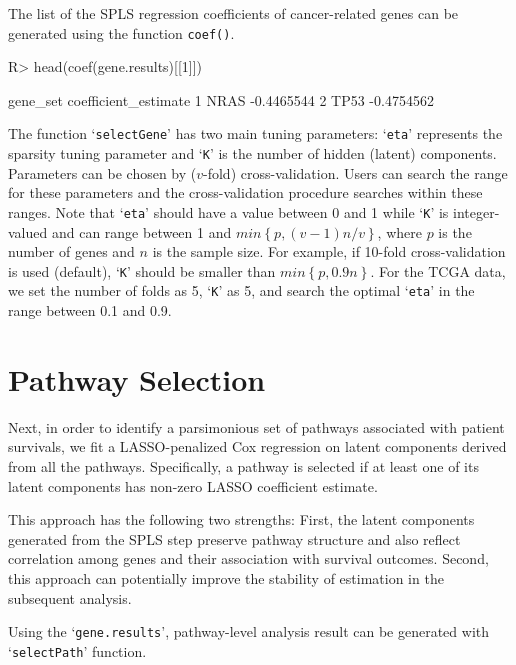 \documentclass[11pt]{article}
\begin{document}
The list of the SPLS regression coefficients of cancer-related genes can be generated using the function \texttt{coef()}.

\begin{Schunk}
\begin{Sinput}
R> head(coef(gene.results)[[1]])
\end{Sinput}
\begin{Soutput}
  gene_set coefficient_estimate
1     NRAS           -0.4465544
2     TP53           -0.4754562
\end{Soutput}
\end{Schunk}

The function `\texttt{selectGene}' has two main tuning parameters: `\texttt{eta}' represents the sparsity tuning parameter and `\texttt{K}' is the number of hidden (latent) components. Parameters can be chosen by ($v$-fold) cross-validation. Users can search the range for these parameters and the cross-validation procedure searches within these ranges. Note that `\texttt{eta}' should have a value between 0 and 1 while `\texttt{K}' is integer-valued and can range between
1 and $ min \left\{ p, (v-1) n / v \right\} $, where $p$ is the number of genes and $n$ is the sample size. For example, if 10-fold cross-validation is used (default), `\texttt{K}' should be smaller than $ min \left\{ p, 0.9 n \right\} $. For the TCGA data, we set the number of folds as 5, `\texttt{K}' as 5, and search  the optimal `\texttt{eta}' in the range between 0.1 and 0.9.

\section{Pathway Selection}

Next, in order to identify a parsimonious set of pathways associated with patient survivals, we fit a LASSO-penalized Cox regression \cite{LASSO} on latent components derived from all the pathways.
Specifically, a pathway is selected if at least one of its latent components has non-zero LASSO coefficient estimate.

This approach has the following two strengths:
First, the latent components generated from the SPLS step preserve pathway structure and also reflect correlation among genes and their association with survival outcomes. Second, this approach can potentially improve the stability of estimation in the subsequent analysis.

Using the `\texttt{gene.results}', pathway-level analysis result can be generated with `\texttt{selectPath}' function.
\end{document}
